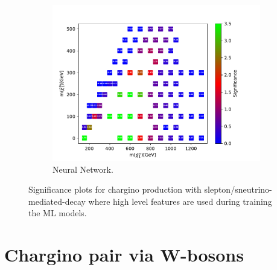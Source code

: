 \begin{figure}[H]
    \begin{subfigure}[t!]{0.49\textwidth}
    \includegraphics[width = \textwidth]{Figures/Significances/significance_NN_slepsnu_High_level.pdf}
    \caption{Neural Network.}
        \label{fig:signHighslepsnuNN}
    \end{subfigure}
    \caption{Significance plots for chargino production with slepton/sneutrino-mediated-decay where high level features are used during training the ML models.}
    \label{fig:signHighslepsnu}
\end{figure}



























\section{Chargino pair via W-bosons}



